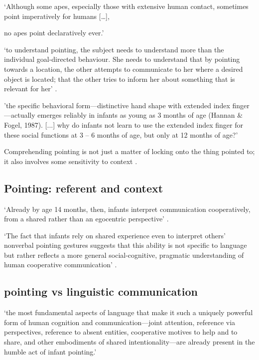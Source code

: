 \documentclass[12pt]{extarticle}
\begin{document}
\begin{multicols}{3}
‘Although some apes, especially those with extensive human contact, sometimes point imperatively for humans […],
 
no apes point declaratively ever.’
\citep[p.\ 510]{Tomasello:2010dy}
 
‘to understand pointing, the subject needs to understand more than the individual goal-directed behaviour. She needs to understand that by pointing towards a location, the other attempts to communicate to her where a desired object is located; that the other tries to inform her about something that is relevant for her’
\citep[p.\ 6]{Moll:2007gu}.
 
'the specific behavioral form---distinctive hand shape with extended index finger---actually emerges reliably in infants as young as 3 months of age (Hannan \& Fogel, 1987). [...] why do infants not learn to use the extended index finger for these social functions at 3 – 6 months of age, but only at 12 months of age?' \citep[p.\ 716]{Tomasello:2007fi}
 
Comprehending pointing is not just a matter of locking onto the thing pointed to; it also involves some sensitivity to context \citep[see][]{Liebal:2010lr}.
 
\subsection{Pointing: referent and context}
 
‘Already by age 14 months, then, infants interpret communication cooperatively, from a shared rather than an egocentric perspective’ \citep[p.\ 269]{Liebal:2010lr}.
 
‘The fact that infants rely on shared experience even to interpret others’ nonverbal pointing gestures suggests that this ability is not specific to language but rather reflects a more general social-cognitive, pragmatic understanding of human cooperative communication’ \citep[p.\ 270]{Liebal:2010lr}.
 
\subsection{pointing vs linguistic communication}
 
‘the most fundamental aspects of language that make it such a uniquely powerful form of human cognition and communication---joint attention, reference via perspectives, reference to absent entities, cooperative motives to help and to share, and other embodiments of shared intentionality---are already present in the humble act of infant pointing.’ \citep[p.\ 719]{Tomasello:2007fi}
 

\end{multicols}
\end{document}
